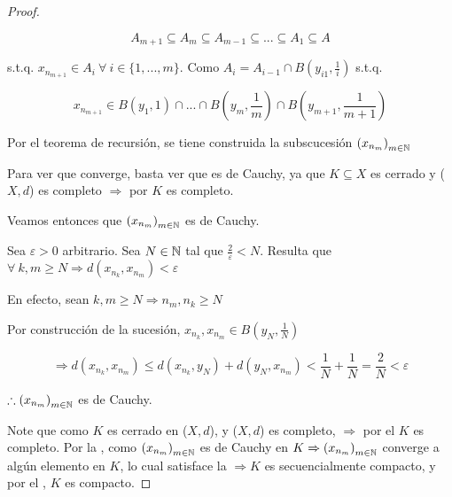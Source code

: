 \begin{proof}
\begin{enumerate}
        $$A_{m+1} \subseteq A_m \subseteq A_{m-1} \subseteq ... \subseteq A_1 \subseteq A$$

        s.t.q. $x_{n_{m+1}} \in A_i \: \forall \: i \in \{1, ..., m \}$. Como $A_{i} = A_{i-1} \cap B\left( y_{i1}, \frac{1}{i} \right)$ s.t.q.

        $$ x_{n_{m+1}}  \in B(y_1, 1) \cap ... \cap  B\left( y_m, \frac{1}{m} \right) \cap B\left( y_{m+1}, \frac{1}{m+1} \right)$$

        Por el teorema de recursión, se tiene construida la subscucesión $ {\left( x_{n_m}\right)}_{m \in \mathbb{N}}$

        Para ver que converge, basta ver que es de Cauchy, ya que $K \subseteq X$ es cerrado y ($X,d$) es completo $\Rightarrow$ por  $K$ es completo.

        Veamos entonces que $ {\left( x_{n_m}\right)}_{m \in \mathbb{N}}$ es de Cauchy.

        Sea $\varepsilon > 0$ arbitrario. Sea $N \in \mathbb{N}$ tal que $\frac{2}{\varepsilon} < N$. Resulta que $\forall \: k, m \geqslant N \Rightarrow d(x_{n_k}, x_{n_m}) < \varepsilon$

        En efecto, sean $k, m \geqslant N \Rightarrow n_m , n_k \geqslant N$

        Por construcción de la sucesión, $x_{n_k}, x_{n_m} \in B\left( y_{N}, \frac{1}{N} \right)$

        $$\Rightarrow  d(x_{n_k}, x_{n_m}) \leqslant d(x_{n_k}, y_N) + d(y_N, x_{n_m}) < \frac{1}{N} + \frac{1}{N} = \frac{2}{N} < \varepsilon$$

        $ \therefore {\left( x_{n_m}\right)}_{m \in \mathbb{N}}$ es de Cauchy.
    \end{enumerate}

    Note que como $K$ es cerrado en ($X,d$), y ($X,d$) es completo, $\Rightarrow$ por el  $K$ es completo. Por la , como $ {\left( x_{n_m}\right)}_{m \in \mathbb{N}}$ es de Cauchy en $K \Rightarrow {\left( x_{n_m}\right)}_{m \in \mathbb{N}}$ converge a algún elemento en $K$, lo cual satisface la  $\Rightarrow K$ es secuencialmente compacto, y por el , $K$ es compacto.
\end{proof}
